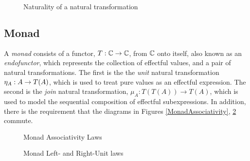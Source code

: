 \documentclass{Report}
\begin{document}
\begin{figure}
    \centering
    \begin{minipage}{0.45\textwidth}
        \centering
        \begin{framed}
    \end{framed}
        \caption{Naturality of a natural transformation}
        \label{Naturality}
    \end{minipage}\hfill
\end{figure}



\subsection{Monad}
A \textit{monad} consists of a functor, $T: \mathbb{C} \rightarrow \mathbb{C}$, from $\mathbb{C}$ onto itself, also known as an \textit{endofunctor}, which represents the collection of effectful values, and a pair of natural transformations. The first is the the \textit{unit} natural transformation $\eta_{A}: A\rightarrow T(A)$, which is used to treat pure values as an effectful expression. The second is the \textit{join} natural transformation, $\mu_{A}: T(T(A)) \rightarrow T(A)$,  which is used to model the sequential composition of effectful subexpressions. In addition, there is the requirement that the diagrams in Figures \ref{MonadAssociativity}, \ref{MonadUnits} commute.


\begin{figure}
\begin{framed}  
        \centering
        \begin{minipage}{0.45\textwidth}
            \centering
            \caption{Monad Associativity Laws}
            \label{MonadAssociativity}
        \end{minipage}\hfill
        \begin{minipage}{0.45\textwidth}
            \centering
            \caption{Monad Left- and Right-Unit laws}
            \label{MonadUnits}
        \end{minipage}
\end{framed}
\end{figure}
\end{document}

